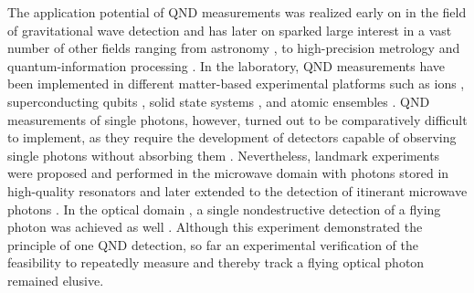 \documentclass[prl,twocolumn,amsmath,amssymb,bibnotes,aps,longbibliography]{revtex4-1}
\begin{document}
The application potential of QND measurements was realized early on in the field of  gravitational wave detection \cite{braginsky1980,braginsky1996} and has later on sparked large interest in a vast number of other fields ranging from astronomy \cite{kellerer2014quantum}, to high-precision metrology \cite{giovanetti2004, ma2011} and quantum-information processing \cite{ralph2006}. In the laboratory, QND measurements have been implemented in different matter-based experimental platforms such as ions \cite{hume2007}, superconducting qubits \cite{lupacscu2007}, solid state systems \cite{neumann2010}, and atomic ensembles \cite{kuzmich2000}. QND measurements of single photons, however, turned out to be comparatively difficult to implement, as they require the development of detectors capable of observing single photons without absorbing them \cite{braginsky1989}. Nevertheless, landmark experiments were proposed and performed in the microwave domain with photons stored in high-quality resonators \cite{brune1992, nogues1999seeing, guerlin2007} and later extended to the detection of itinerant microwave photons \cite{kono2018quantum, besse2018}. In the optical domain \cite{friberg1992, grangier1998}, a single nondestructive detection of a flying photon was achieved as well \cite{reiserer2013}. Although this experiment demonstrated the principle of one QND detection, so far an experimental verification of the feasibility to repeatedly measure and thereby track a flying optical photon remained elusive. 
\end{document}
